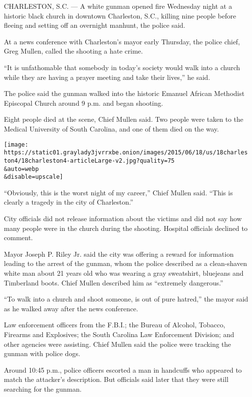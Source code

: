 CHARLESTON, S.C. --- A white gunman opened fire Wednesday night at a
historic black church in downtown Charleston, S.C., killing nine people
before fleeing and setting off an overnight manhunt, the police said.

At a news conference with Charleston's mayor early Thursday, the police
chief, Greg Mullen, called the shooting a hate crime.

``It is unfathomable that somebody in today's society would walk into a
church while they are having a prayer meeting and take their lives,'' he
said.

The police said the gunman walked into the historic Emanuel African
Methodist Episcopal Church around 9 p.m. and began shooting.

Eight people died at the scene, Chief Mullen said. Two people were taken
to the Medical University of South Carolina, and one of them died on the
way.

\texttt{[image: https://static01.graylady3jvrrxbe.onion/images/2015/06/18/us/18charleston4/18charleston4-articleLarge-v2.jpg?quality=75\\\&auto=webp\\\&disable=upscale]}

``Obviously, this is the worst night of my career,'' Chief Mullen said.
``This is clearly a tragedy in the city of Charleston.''

City officials did not release information about the victims and did not
say how many people were in the church during the shooting. Hospital
officials declined to comment.

Mayor Joseph P. Riley Jr. said the city was offering a reward for
information leading to the arrest of the gunman, whom the police
described as a clean-shaven white man about 21 years old who was wearing
a gray sweatshirt, bluejeans and Timberland boots. Chief Mullen
described him as ``extremely dangerous.''

``To walk into a church and shoot someone, is out of pure hatred,'' the
mayor said as he walked away after the news conference.

Law enforcement officers from the F.B.I.; the Bureau of Alcohol,
Tobacco, Firearms and Explosives; the South Carolina Law Enforcement
Division; and other agencies were assisting. Chief Mullen said the
police were tracking the gunman with police dogs.

Around 10:45 p.m., police officers escorted a man in handcuffs who
appeared to match the attacker's description. But officials said later
that they were still searching for the gunman.

